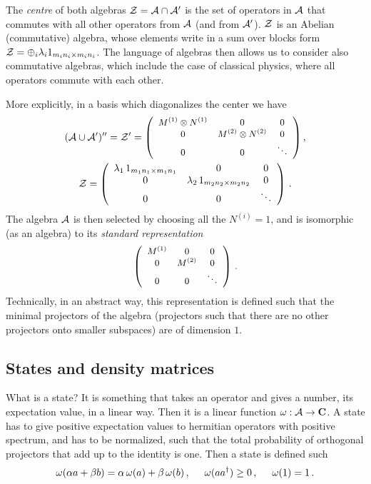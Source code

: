 \documentclass[12pt]{article}
\numberwithin{equation}{section}
\newcommand{\be}{\begin{equation}}
\newcommand{\ee}{\end{equation}}
\begin{document}
The {\sl centre} of both algebras ${\cal Z}={\cal A}\cap {\cal A}'$ is the set of operators in ${\cal A}$ that commutes with all other operators from ${\cal A}$ (and from ${\cal A}'$). ${\cal Z}$ is an Abelian (commutative) algebra, whose elements write in a sum over blocks form ${\cal Z}=\oplus_i \lambda_i 1_{m_i n_i\times m_i n_i}$. The language of algebras then allows us to consider also commutative algebras, which include the case of classical physics, where all operators commute with each other.

More explicitly, in  a basis which diagonalizes the center we have
\begin{multline}
\small \small\small
({\cal A}\cup {\cal A}')''={\cal Z}'=
\left(\begin{array}{ccc}
  M^{(1)}\otimes N^{(1)} & 0 & 0\\
  0 & M^{(2)}\otimes N^{(2)} & 0 \\
  0 & 0 & \ddots
\end{array}\right), \\  {\cal Z}=
\left(\begin{array}{ccc}
  \lambda_1\,1_{m_1 n_1\times m_1 n_1} & 0 & 0 \\
  0 & \lambda_2\, 1_{m_2 n_2\times m_2 n_2} &  0 \\
  0 & 0 & \ddots
\end{array}\right)\,.
\end{multline} 
The algebra ${\cal A}$ is then selected by choosing all the $N^{(i)}=1$, and is isomorphic (as an algebra) to its {\sl standard representation}
\begin{equation}\small
 \left(\begin{array}{ccc}
  M^{(1)} & 0 & 0 \\
  0 & M^{(2)} & 0\\
  0 & 0 & \ddots
\end{array}\right)\,.
\end{equation}
Technically, in an abstract way, this representation is defined such that the minimal projectors of the algebra (projectors such that there are no other projectors onto smaller subspaces) are of dimension $1$.  

\subsection{States and density matrices}

What is a state? It is something that takes an operator and gives a number, its expectation value, in a linear way. Then it is a linear function $\omega: {\cal A}\rightarrow {\mathbf{C}}$. A state has to give positive expectation values to hermitian operators with positive spectrum, and has to be normalized, such that the total probability of orthogonal projectors that add up to the identity is one. Then a state is defined such 
\be
\omega(\alpha a+ \beta b)=\alpha \,\omega(a)+\beta\, \omega(b)\,, \hspace{.5cm} \omega(a a^\dagger)\ge 0\,, \hspace{0.5cm} \omega(1)=1\,. 
\ee 
 
\end{document}
